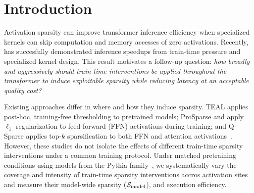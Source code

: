 
\section{Introduction}
\label{sec:introduction}

Activation sparsity can improve transformer inference efficiency when specialized kernels can skip computation and memory accesses of zero activations. Recently, \citet{cetin2026sparser} has succesfully demonstrated inference speedups from train-time pressure and specialized kernel design. This result motivates a follow-up question: \emph{how broadly and aggressively should train-time interventions be applied throughout the transformer to induce exploitable sparsity while reducing latency at an acceptable quality cost?}

Existing approaches differ in where and how they induce sparsity. TEAL applies post-hoc, training-free thresholding to pretrained models; ProSparse and \citet{cetin2026sparser} apply $\ell_1$ regularization to feed-forward (FFN) activations during training; and Q-Sparse applies top-$k$ sparsification to both FFN and attention activations~\citep{liu2024teal,song2024prosparse,wang2024qsparse}. However, these studies do not isolate the effects of different train-time sparsity interventions under a common training protocol. Under matched pretraining conditions using models from the Pythia family~\citep{biderman2023pythia}, we systematically vary the coverage and intensity of train-time sparsity interventions accros activation sites and measure their model-wide sparsity ($\mathcal{S}_{\mathrm{model}}$), and execution efficiency.

